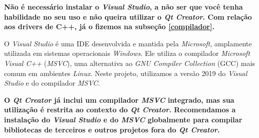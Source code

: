 \documentclass[a4paper,11pt]{article}
\newcommand{\qtcreator}{\textit{Qt Creator}}
\newcommand{\visualstudio}{\textit{Visual Studio}}
\newcommand{\msvc}{\textit{MSVC}}
\newcommand{\windows}{\textit{Windows}}
\newcommand{\linux}{\textit{Linux}}
\newcommand{\cautionbox}[1]{
	\vskip 5mm
	\begin{leftbar}
		\textbf{#1}
	\end{leftbar}
	\vskip 5mm
}
\begin{document}
\cautionbox{Não é necessário instalar o \visualstudio{}, a não ser que você tenha habilidade no seu uso e não queira utilizar o \qtcreator{}.
Com relação aos drivers de C++, já o fizemos na subseção \ref{compilador}.
 }


O \visualstudio{} é uma IDE desenvolvida e mantida pela \textit{Microsoft}, amplamente utilizada em sistemas operacionais \windows{}. Ele utiliza o compilador \emph{Microsoft Visual C++} (\msvc{}), uma alternativa ao \emph{GNU Compiler Collection} (GCC) mais comum em ambientes \linux{}. Neste projeto, utilizamos a versão 2019 do \visualstudio{} e do compilador \msvc{}.

\cautionbox{
	O \qtcreator{} já inclui um compilador \msvc{} integrado, mas sua utilização é restrita ao contexto do \qtcreator{}. Recomendamos a instalação do \visualstudio{} e do \msvc{} globalmente para compilar bibliotecas de terceiros e outros projetos fora do \qtcreator{}.
}
\end{document}
